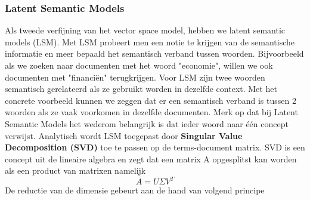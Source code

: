 \subsubsection{Latent Semantic Models}\label{Latent Semantic Models}

Als tweede verfijning van het vector space model, hebben we latent semantic models (LSM). Met LSM probeert men een notie te krijgen van de semantische informatie en meer bepaald het semantisch verband tussen woorden. Bijvoorbeeld als we zoeken naar documenten met het woord "economie", willen we ook documenten met "financi\"en" terugkrijgen. Voor LSM zijn twee woorden semantisch gerelateerd als ze gebruikt worden in dezelfde context. Met het concrete voorbeeld kunnen we zeggen dat er een semantisch verband is tussen 2 woorden als ze vaak voorkomen in dezelfde documenten.
\newline
Merk op dat bij Latent Semantic Models het wederom belangrijk is dat ieder woord naar \'e\'en concept verwijst.
%
\newline
Analytisch wordt LSM toegepast door \textbf{Singular Value Decomposition (SVD)} toe te passen op de terms-document matrix. SVD is een concept uit de lineaire algebra en zegt dat een matrix A opgesplitst kan worden als een product van matrixen namelijk \\
\[A = U\Sigma V^T \]
De reductie van de dimensie gebeurt aan de hand van volgend principe
%
\newcommand{\vect}{\mathbf}
\newcommand{\nul}{\operatorname{Nul}}
\newcommand{\col}{\operatorname{Kolommen }}
\newcommand{\row}{\operatorname{Rijen}}
